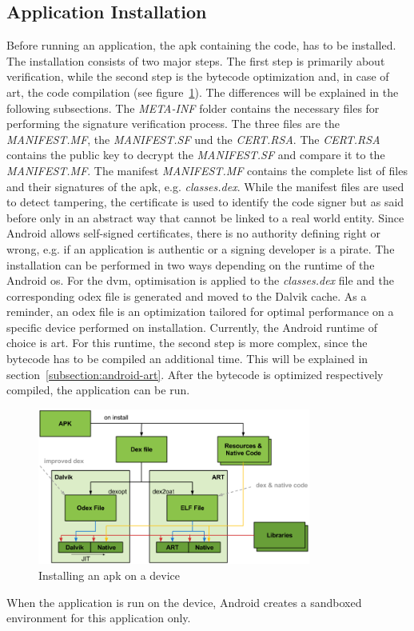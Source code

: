 \subsection{Application Installation} \label{subsection:android-install}
Before running an application, the \gls{apk} containing the code, has to be installed.
The installation consists of two major steps.
The first step is primarily about verification, while the second step is the bytecode optimization and, in case of \gls{art}, the code compilation (see figure~\ref{fig:install}).
The differences will be explained in the following subsections.
\newline
The \textit{META-INF} folder contains the necessary files for performing the signature verification process.
The three files are the \textit{MANIFEST.MF}, the \textit{MANIFEST.SF} und the \textit{CERT.RSA}.
The \textit{CERT.RSA} contains the public key to decrypt the \textit{MANIFEST.SF} and compare it to the \textit{MANIFEST.MF}.
The manifest \textit{MANIFEST.MF} contains the complete list of files and their signatures of the \gls{apk}, e.g. \textit{classes.dex}.
While the manifest files are used to detect tampering, the certificate is used to identify the code signer but as said before only in an abstract way that cannot be linked to a real world entity.
Since Android allows self-signed certificates, there is no authority defining right or wrong, e.g. if an application is authentic or a signing developer is a pirate. \cite{codeSigning} \cite{androidSigning} \cite{nelenkovSelf}
\newline
The installation can be performed in two ways depending on the runtime of the Android \gls{os}.
For the \gls{dvm}, optimisation is applied to the \textit{classes.dex} file and the corresponding \gls{odex} file is generated and moved to the Dalvik cache.
As a reminder, an \gls{odex} file is an optimization tailored for optimal performance on a specific device performed on installation.
\newline
Currently, the Android runtime of choice is \gls{art}.
For this runtime, the second step is more complex, since the bytecode has to be compiled an additional time.
This will be explained in section~\ref{subsection:android-art}.
\newline
After the bytecode is optimized respectively compiled, the application can be run.
\newline
\begin{figure}[h]
    \centering
    \includegraphics[width=0.8\textwidth]{data/install.png}
    \caption{Installing an \gls{apk} on a device \cite{googleIOArt}}
    \label{fig:install}
\end{figure}
When the application is run on the device, Android creates a sandboxed environment for this application only.
